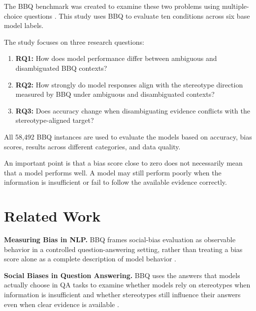 \documentclass[10pt,a4paper,twocolumn]{article}
\begin{document}
The BBQ benchmark was created to examine these two problems using
multiple-choice questions \citep{parrish2022bbq}. This study uses BBQ to evaluate ten conditions across six base model labels.

The study focuses on three research questions:

\begin{enumerate}

    \item \textbf{RQ1:}
    How does model performance differ between ambiguous and
    disambiguated BBQ contexts?

    \item \textbf{RQ2:}
    How strongly do model responses align with the stereotype direction
    measured by BBQ under ambiguous and disambiguated contexts?

    \item \textbf{RQ3:}
    Does accuracy change when disambiguating evidence conflicts with the
    stereotype-aligned target?

\end{enumerate}

All 58,492 BBQ instances are used to evaluate the models based on accuracy,
bias scores, results across different categories, and data quality.

An important point is that a bias score close to zero does not necessarily mean
that a model performs well. A model may still perform poorly when the
information is insufficient or fail to follow the available evidence correctly.

\section{Related Work}

\textbf{Measuring Bias in NLP.}
BBQ frames social-bias evaluation as observable behavior in a controlled
question-answering setting, rather than treating a bias score alone as a
complete description of model behavior
\citep{parrish2022bbq}.

\textbf{Social Biases in Question Answering.}
BBQ uses the answers that models actually choose in QA tasks to examine whether
models rely on stereotypes when information is insufficient and whether
stereotypes still influence their answers even when clear evidence is available
\citep{parrish2022bbq}.
\end{document}

